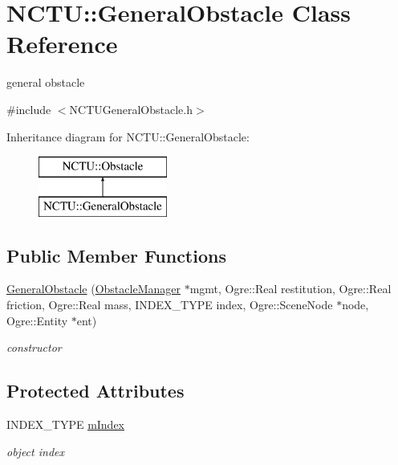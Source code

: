 \hypertarget{class_n_c_t_u_1_1_general_obstacle}{}\section{N\+C\+TU\+:\+:General\+Obstacle Class Reference}
\label{class_n_c_t_u_1_1_general_obstacle}


general obstacle  




{\ttfamily \#include $<$N\+C\+T\+U\+General\+Obstacle.\+h$>$}

Inheritance diagram for N\+C\+TU\+:\+:General\+Obstacle\+:\begin{figure}[H]
\begin{center}
\leavevmode
\includegraphics[height=2.000000cm]{class_n_c_t_u_1_1_general_obstacle}
\end{center}
\end{figure}
\subsection*{Public Member Functions}
\begin{DoxyCompactItemize}
\item 
\hyperlink{class_n_c_t_u_1_1_general_obstacle_a470f226cabad51ad2ea342e445507bd4}{General\+Obstacle} (\hyperlink{class_n_c_t_u_1_1_obstacle_manager}{Obstacle\+Manager} $\ast$mgmt, Ogre\+::\+Real restitution, Ogre\+::\+Real friction, Ogre\+::\+Real mass, I\+N\+D\+E\+X\+\_\+\+T\+Y\+PE index, Ogre\+::\+Scene\+Node $\ast$node, Ogre\+::\+Entity $\ast$ent)\hypertarget{class_n_c_t_u_1_1_general_obstacle_a470f226cabad51ad2ea342e445507bd4}{}\label{class_n_c_t_u_1_1_general_obstacle_a470f226cabad51ad2ea342e445507bd4}

\begin{DoxyCompactList}\small\item\em constructor \end{DoxyCompactList}\end{DoxyCompactItemize}
\subsection*{Protected Attributes}
\begin{DoxyCompactItemize}
\item 
I\+N\+D\+E\+X\+\_\+\+T\+Y\+PE \hyperlink{class_n_c_t_u_1_1_general_obstacle_a5fa820e0ed1303f92286d65a83fdc5f5}{m\+Index}\hypertarget{class_n_c_t_u_1_1_general_obstacle_a5fa820e0ed1303f92286d65a83fdc5f5}{}\label{class_n_c_t_u_1_1_general_obstacle_a5fa820e0ed1303f92286d65a83fdc5f5}

\begin{DoxyCompactList}\small\item\em object index \end{DoxyCompactList}\end{DoxyCompactItemize}
